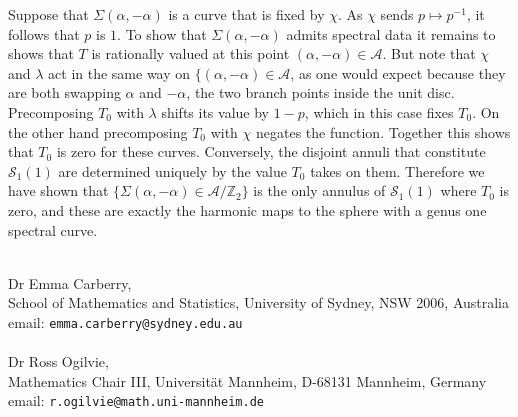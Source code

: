 \documentclass{article}
\numberwithin{equation}{section}
\numberwithin{figure}{section}
\begin{document}
Suppose that $\Sigma(\alpha,-\alpha)$ is a curve that is fixed by $\chi$. As $\chi$ sends $p \mapsto p^{-1}$, it follows that $p$ is $1$. To show that $\Sigma(\alpha,-\alpha)$ admits spectral data it remains to shows that $T$ is rationally valued at this point $(\alpha,-\alpha) \in \mathcal{A}$. But note that $\chi$ and $\lambda$ act in the same way on $\{(\alpha,-\alpha) \in \mathcal{A}$, as one would expect because they are both swapping $\alpha$ and $-\alpha$, the two branch points inside the unit disc. Precomposing $T_0$ with $\lambda$ shifts its value by $1-p$, which in this case fixes $T_0$. On the other hand precomposing $T_0$ with $\chi$ negates the function. Together this shows that $T_0$ is zero for these curves. Conversely, the disjoint annuli that constitute $\mathcal{S}_1(1)$ are determined uniquely by the value $T_0$ takes on them.
Therefore we have shown that $\{\Sigma(\alpha,-\alpha) \in \mathcal{A}/\mathbb{Z}_2\}$ is the only annulus of $\mathcal{S}_1(1)$ where $T_0$ is zero, and these are exactly the harmonic maps to the sphere with a genus one spectral curve.




\vfill
~\\
Dr Emma Carberry, \\
School of Mathematics and Statistics, University of Sydney, NSW 2006, Australia \\
email: \texttt{emma.carberry@sydney.edu.au}\\
~\\
Dr Ross Ogilvie, \\
Mathematics Chair III, Universit\"at Mannheim, D-68131 Mannheim, Germany \\
email: \texttt{r.ogilvie@math.uni-mannheim.de}
\end{document}
